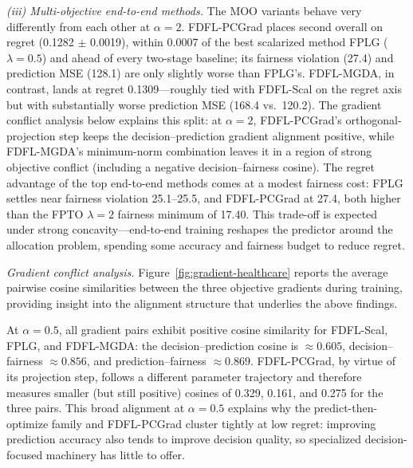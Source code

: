 \documentclass[ijoc,sglanonrev]{informs4}
\begin{document}
\emph{(iii) Multi-objective end-to-end methods.}
The MOO variants behave very differently from each other at $\alpha = 2$. FDFL-PCGrad places second overall on regret (0.1282 $\pm$ 0.0019), within 0.0007 of the best scalarized method FPLG ($\lambda = 0.5$) and ahead of every two-stage baseline; its fairness violation (27.4) and prediction MSE (128.1) are only slightly worse than FPLG's. FDFL-MGDA, in contrast, lands at regret 0.1309---roughly tied with FDFL-Scal on the regret axis but with substantially worse prediction MSE (168.4 vs.\ 120.2). The gradient conflict analysis below explains this split: at $\alpha = 2$, FDFL-PCGrad's orthogonal-projection step keeps the decision--prediction gradient alignment positive, while FDFL-MGDA's minimum-norm combination leaves it in a region of strong objective conflict (including a negative decision--fairness cosine). The regret advantage of the top end-to-end methods comes at a modest fairness cost: FPLG settles near fairness violation 25.1--25.5, and FDFL-PCGrad at 27.4, both higher than the FPTO $\lambda = 2$ fairness minimum of 17.40. This trade-off is expected under strong concavity---end-to-end training reshapes the predictor around the allocation problem, spending some accuracy and fairness budget to reduce regret.

\textit{Gradient conflict analysis.}
Figure~\ref{fig:gradient-healthcare} reports the average pairwise cosine similarities between the three objective gradients during training, providing insight into the alignment structure that underlies the above findings.


At $\alpha = 0.5$, all gradient pairs exhibit positive cosine similarity for FDFL-Scal, FPLG, and FDFL-MGDA: the decision--prediction cosine is $\approx 0.605$, decision--fairness $\approx 0.856$, and prediction--fairness $\approx 0.869$. FDFL-PCGrad, by virtue of its projection step, follows a different parameter trajectory and therefore measures smaller (but still positive) cosines of 0.329, 0.161, and 0.275 for the three pairs. This broad alignment at $\alpha = 0.5$ explains why the predict-then-optimize family and FDFL-PCGrad cluster tightly at low regret: improving prediction accuracy also tends to improve decision quality, so specialized decision-focused machinery has little to offer.
\end{document}
